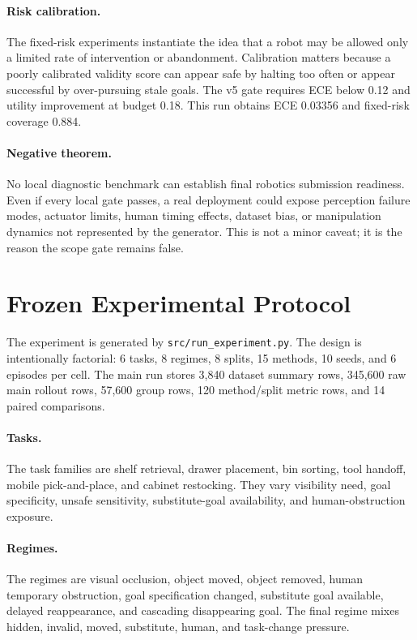 \documentclass{article}
\begin{document}
\paragraph{Risk calibration.}
The fixed-risk experiments instantiate the idea that a robot may be allowed only a limited rate of intervention or abandonment. Calibration matters because a poorly calibrated validity score can appear safe by halting too often or appear successful by over-pursuing stale goals. The v5 gate requires ECE below 0.12 and utility improvement at budget 0.18. This run obtains ECE 0.03356 and fixed-risk coverage 0.884.

\paragraph{Negative theorem.}
No local diagnostic benchmark can establish final robotics submission readiness. Even if every local gate passes, a real deployment could expose perception failure modes, actuator limits, human timing effects, dataset bias, or manipulation dynamics not represented by the generator. This is not a minor caveat; it is the reason the scope gate remains false.

\section{Frozen Experimental Protocol}
The experiment is generated by \texttt{src/run\_experiment.py}. The design is intentionally factorial: 6 tasks, 8 regimes, 8 splits, 15 methods, 10 seeds, and 6 episodes per cell. The main run stores 3,840 dataset summary rows, 345,600 raw main rollout rows, 57,600 group rows, 120 method/split metric rows, and 14 paired comparisons.

\paragraph{Tasks.}
The task families are shelf retrieval, drawer placement, bin sorting, tool handoff, mobile pick-and-place, and cabinet restocking. They vary visibility need, goal specificity, unsafe sensitivity, substitute-goal availability, and human-obstruction exposure.

\paragraph{Regimes.}
The regimes are visual occlusion, object moved, object removed, human temporary obstruction, goal specification changed, substitute goal available, delayed reappearance, and cascading disappearing goal. The final regime mixes hidden, invalid, moved, substitute, human, and task-change pressure.
\end{document}
